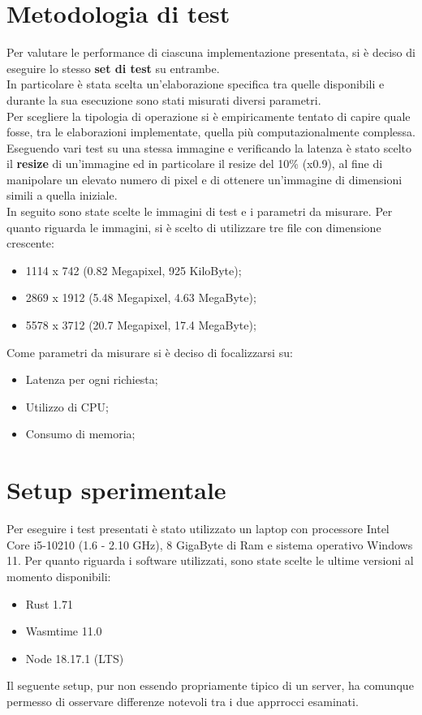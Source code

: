\section{Metodologia di test}
Per valutare le performance di ciascuna implementazione presentata, si è deciso di eseguire lo stesso \textbf{set di test} su entrambe.
\\In particolare è stata scelta un'elaborazione specifica tra quelle disponibili e durante la sua esecuzione sono stati misurati diversi parametri.
\\Per scegliere la tipologia di operazione si è empiricamente tentato di capire quale fosse, tra le elaborazioni implementate, quella più computazionalmente complessa.
Eseguendo vari test su una stessa immagine e verificando la latenza è stato scelto il \textbf{resize} di un'immagine ed in particolare il resize del 10\% (x0.9), al fine di manipolare un elevato numero di pixel e di ottenere un'immagine di dimensioni simili a quella iniziale.
\\In seguito sono state scelte le immagini di test e i parametri da misurare.
Per quanto riguarda le immagini, si è scelto di utilizzare tre file con dimensione crescente:
\begin{itemize}
    \item 1114 x 742 (0.82 Megapixel, 925 KiloByte);
    \item 2869 x 1912 (5.48 Megapixel, 4.63 MegaByte);
    \item 5578 x 3712 (20.7 Megapixel, 17.4 MegaByte);
\end{itemize}
Come parametri da misurare si è deciso di focalizzarsi su:
\begin{itemize}
    \item Latenza per ogni richiesta;
    \item Utilizzo di CPU;
    \item Consumo di memoria;
\end{itemize}
\section{Setup sperimentale}
Per eseguire i test presentati è stato utilizzato un laptop con processore Intel Core i5-10210 (1.6 - 2.10 GHz), 8 GigaByte di Ram e sistema operativo Windows 11.
Per quanto riguarda i software utilizzati, sono state scelte le ultime versioni al momento disponibili:
\begin{itemize}
    \item Rust 1.71
    \item Wasmtime 11.0
    \item Node 18.17.1 (LTS)
\end{itemize}
Il seguente setup, pur non essendo propriamente tipico di un server, ha comunque permesso di osservare differenze notevoli tra i due apprrocci esaminati.
